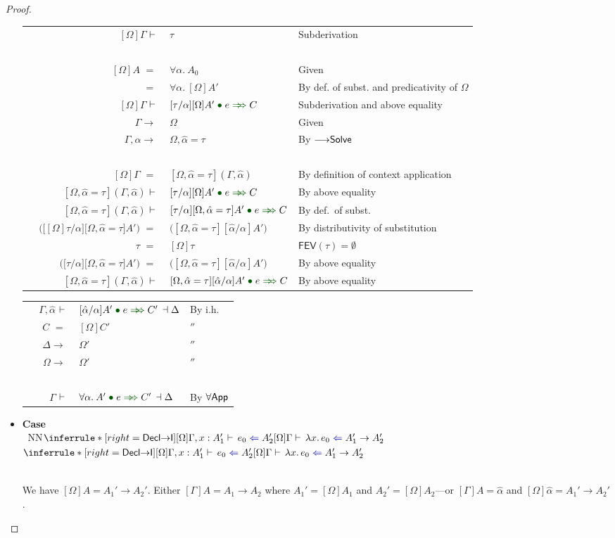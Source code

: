 \documentclass[a4paper]{article}
\makeatletter
\newcommand{\mathcolor}[2]{\text{\textcolor{#1}{\ensuremath{#2}}}}
\newcommand{\arr}{\rightarrow}
\def\CompactJudgments{0}
\newcommand{\entails}{\mathrel{\ifnum\CompactJudgments=1\vdash \else \vdash\,\fi}}
\newcommand{\ctxoutsym}{\ifnum\CompactJudgments=1\dashv \else \,\dashv \fi}
\newcommand{\ctxout}[1]{\mathrel{\ctxoutsym}{#1}}
\newcommand{\xfev}{\mathsf{FEV}}
\newcommand{\fev}[1]{\xfev(#1)}
\newcommand{\FEV}[1]{\fev{#1}}
\gdef\xxDerivationProofCaseColor{N}
\newcommand{\DerivationProofCase}[3]{\smallskip
     \item \parbox[t]{100ex}{\textbf{Case } \\[-0.5em]
       $~$\hspace{5ex}
       \if\xxDerivationProofCaseColor N\ensuremath{\Infer{#1}{#2}{#3}}
       \else \colorbox{\xxDerivationProofCaseColor}{\ensuremath{\Infer{#1}{#2}{#3}}}\fi }\nopagebreak \\[-0.8ex]
  }
\newcommand{\BeginProof}{\renewcommand{\arraystretch}{1.1} \begin{tabular}[b]{r@{}r @{} l  l}}
\newcommand{\EndProof}{\end{tabular} \renewcommand{\arraystretch}{\mydefaultarraystretch}}
\newcommand{\Hand}{\text{\Pointinghand~~~~}}
\newcommand{\Pf}[4] {&$#1$ $#2$\, & $#3$ & #4 \\}
\newcommand{\Pfmrg}[3] {&$#1$\, & $#2$ & #3 \\}
\newcommand{\mkpf}[4] {\Pf{#2}{#1\,}{#3}{#4}}
\newcommand{\eqPf}[3] {\mkpf{=}{#1}{#2}{#3}}
\newcommand{\continueeqPf}[2] {\mkpf{=}{~}{#1}{#2}}
\newcommand{\proofsep}{\,\\[-0.5em]}
\newenvironment{llproof}{\BeginProof}{\EndProof}
\newcommand{\ditto}{\ensuremath{''}}
\newcommand{\AllSym}{\forall}
\newcommand{\xAll}[1]{\AllSym#1}
\newcommand{\All}[1]{\xAll{#1}.\:}
\newcommand{\Infer}[3]{\inferrule*[right={\text{\strut#1}}]{{}#2\mathstrut}{{}#3\mathstrut}}
\newcommand{\lam}[1]{\lambda #1.\,}
\newcommand{\substextendPf}[3] {\Pfmrg{{#1} \extendssym\,}{#2}{#3}}
\newcommand{\chkcolor}{dBlue}
\newcommand{\appcolor}{dDkGreen}
\newcommand{\chk}{\mathrel{\mathcolor{\chkcolor}{\Leftarrow}}}
\newcommand{\uncoloredsyn}{{\Rightarrow}}
\newcommand{\appsep}{\;{\mathcolor{\appcolor}{\bullet}}\;}
\newcommand{\app}{\mathrel{\mathcolor{\appcolor}{{\uncoloredsyn}\hspace{-1.2ex}{\uncoloredsyn}}}}
\newcommand{\declchkjudg}[3]{\ensuremath{{#1} \entails {#2} \chk {#3}}}
\newcommand{\appjudgPf}[6]{\Pf{#1}{\entails}{{#3} \appsep {#2} \app {#4} \ctxout{#5}}{#6}}
\newcommand{\declappjudgPf}[5]{\Pf{#1}{\entails}{{#3} \appsep {#2} \app {#4}}{#5}}
\newcommand{\hypeq}[2]{{#1} = {#2}}
\newcommand{\alltype}[1]{\All{#1}}
\newcommand{\extendssym}{\longrightarrow}
\newcommand{\judgetpPf}[3]{\Pf{#1}{\entails}{#2}{#3}}
\newcommand{\ahat}{\hat{\alpha}}
\newcommand{\rulename}[1]{\text{\normalfont\textsf{#1}}}
\newcommand{\substextendrulename}[1]{\ensuremath{{\extendssym}{\rulename{#1}}}\xspace}
\newcommand{\substextendSolve}{\substextendrulename{Solve}}
\newcommand{\Decltyrulename}[1]{\ensuremath{\rulename{Decl#1}}\xspace}
\newcommand{\DeclIntrorulename}[1]{\Decltyrulename{\ensuremath{#1}I}}
\newcommand{\DeclArrIntro}{\DeclIntrorulename{\arr}}
\newcommand{\Tyrulename}[1]{\ensuremath{\rulename{#1}}\xspace}
\newcommand{\Apprulename}[1]{\Tyrulename{\ensuremath{#1}App}}
\newcommand{\AllApp}{\Apprulename{\forall}}
\makeatother
\begin{document}
\begin{proof}
\begin{itemize}
            \begin{llproof}
              \judgetpPf{[\Omega]\Gamma}{\tau}   {Subderivation}
              \proofsep
              \eqPf{[\Omega]A}{\alltype{\alpha} A_0}   {Given}
              \continueeqPf{\alltype{\alpha} [\Omega]A'}  {By def. of subst. and predicativity of $\Omega$}
              \declappjudgPf{[\Omega]\Gamma}{e}{[\tau/\alpha][\Omega]A'}{C}  {Subderivation and above equality}
              \substextendPf{\Gamma}{\Omega}   {Given}
              \substextendPf{\Gamma, \ahat}{\Omega, \hypeq{\ahat}{\tau}}  {By \substextendSolve}
              \proofsep
              \eqPf{[\Omega]\Gamma} {[\Omega, \hypeq{\ahat}{\tau}](\Gamma, \ahat)}  {By definition of context application}
              \declappjudgPf{[\Omega, \hypeq{\ahat}{\tau}](\Gamma, \ahat)}{e}{[\tau/\alpha][\Omega]A'}{C}  {By above equality}
              \declappjudgPf{[\Omega, \hypeq{\ahat}{\tau}](\Gamma, \ahat)}{e}{[\tau/\alpha][\Omega, \hypeq{\ahat}{\tau}]A'}{C}  {By def.\ of subst.}
              \eqPf{\big(\big[[\Omega]\tau/\alpha\big]\big[\Omega, \hypeq{\ahat}{\tau}\big]A'\big)} {\big([\Omega, \hypeq{\ahat}{\tau}][\ahat/\alpha]A'\big)}  {By distributivity of substitution}
              \eqPf{\tau}{[\Omega]\tau}   {$\FEV{\tau} = \emptyset$}
              \eqPf{\big(\big[\tau/\alpha\big]\big[\Omega, \hypeq{\ahat}{\tau}\big]A'\big)} {\big([\Omega, \hypeq{\ahat}{\tau}][\ahat/\alpha]A'\big)}  {By above equality}
              \declappjudgPf{[\Omega, \hypeq{\ahat}{\tau}](\Gamma, \ahat)}{e}{[\Omega, \hypeq{\ahat}{\tau}][\ahat/\alpha]A'}{C}  {By above equality}
            \end{llproof}

            \begin{llproof}
              \appjudgPf {\Gamma, \ahat} {e} {[\ahat/\alpha]A'} {C'} {\Delta}   {By i.h.}
\Hand         \eqPf{C}{[\Omega]C'}   {\ditto}
\Hand         \substextendPf{\Delta}{\Omega'}   {\ditto}
\Hand         \substextendPf{\Omega}{\Omega'}   {\ditto}
              \proofsep
\Hand         \appjudgPf{\Gamma}{e}{\alltype{\alpha} A'} {C'} {\Delta}   {By \AllApp}
            \end{llproof}

     \DerivationProofCase{\DeclArrIntro}
          {\declchkjudg{[\Omega]\Gamma, x : A_1'}{e_0}{A_2'}
          }
          {\declchkjudg{[\Omega]\Gamma}{\lam{x} e_0}{A_1' \arr A_2'}}

          We have $[\Omega]A = A_1' \arr A_2'$.  Either $[\Gamma]A = A_1 \arr A_2$
          where $A_1' = [\Omega]A_1$ and $A_2' = [\Omega]A_2$---or
          $[\Gamma]A = \ahat$ and $[\Omega]\ahat = A_1' \arr A_2'$.


\end{itemize}
\end{proof}
\end{document}
